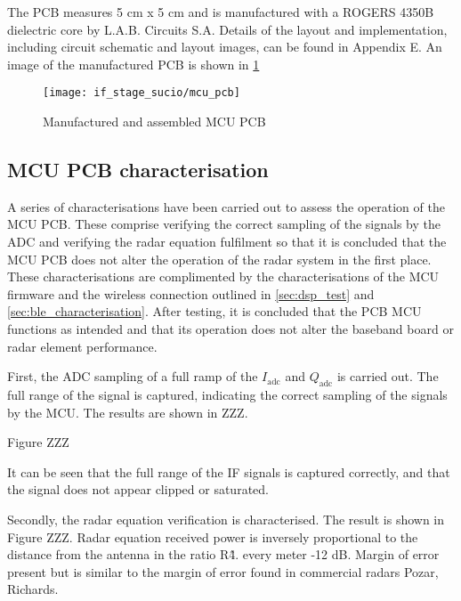 The PCB measures 5 cm x 5 cm and is manufactured with a ROGERS 4350B dielectric core by L.A.B. Circuits S.A. Details of the layout and implementation, including circuit schematic and layout images, can be found in Appendix E. %
An image of the manufactured PCB is shown in \cref{fig:mcu_pcb}

\begin{figure}[h]
	\centering
	\texttt{[image: if\_stage\_sucio/mcu\_pcb]}
	\caption{Manufactured and assembled MCU PCB}
	\label{fig:mcu_pcb}
\end{figure}

\subsection{MCU PCB characterisation}

A series of characterisations have been carried out to assess the operation of the MCU PCB. These comprise verifying the correct sampling of the signals by the ADC and verifying the radar equation fulfilment so that it is concluded that the MCU PCB does not alter the operation of the radar system in the first place. These characterisations are complimented by the characterisations of the MCU firmware and the wireless connection outlined in \cref{sec:dsp_test} and \cref{sec:ble_characterisation}.
After testing, it is concluded that the PCB MCU functions as intended and that its operation does not alter the baseband board or radar element performance.

First, the ADC sampling of a full ramp of the $I_\mathrm{adc}$ and $Q_\mathrm{adc}$ is carried out. The full range of the signal is captured, indicating the correct sampling of the signals by the MCU. The results are shown in ZZZ.

Figure ZZZ

It can be seen that the full range of the IF signals is captured correctly, and that the signal does not appear clipped or saturated.

Secondly, the radar equation verification is characterised.
The result is shown in Figure ZZZ. Radar equation received power is inversely proportional to the distance from the antenna in the ratio R\^4. every meter -12 dB. Margin of error present but is similar to the margin of error found in commercial radars Pozar, Richards.

